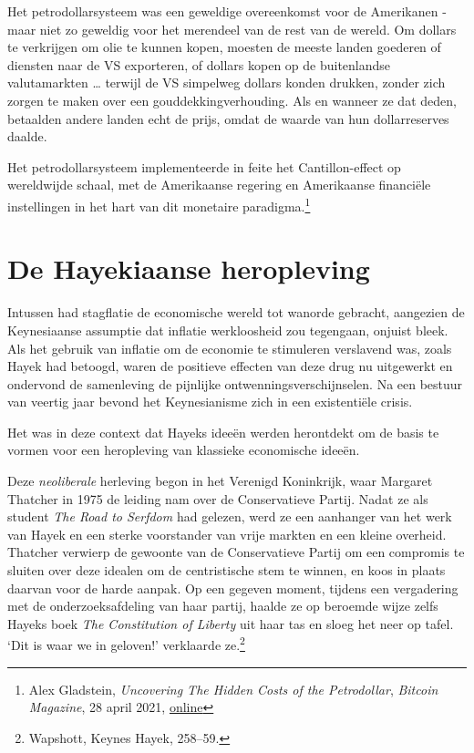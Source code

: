 \documentclass[
  a5paper,
  smalldemyvopaper,11pt,twoside,onecolumn,openright,extrafontsizes,
hidelinks]{memoir}
\begin{document}
Het petrodollarsysteem was een geweldige overeenkomst voor de Amerikanen
- maar niet zo geweldig voor het merendeel van de rest van de wereld. Om
dollars te verkrijgen om olie te kunnen kopen, moesten de meeste landen
goederen of diensten naar de VS exporteren, of dollars kopen op de
buitenlandse valutamarkten \ldots{} terwijl de VS simpelweg dollars
konden drukken, zonder zich zorgen te maken over een
gouddekkingverhouding. Als en wanneer ze dat deden, betaalden andere
landen echt de prijs, omdat de waarde van hun dollarreserves daalde.

Het petrodollarsysteem implementeerde in feite het Cantillon-effect op
wereldwijde schaal, met de Amerikaanse regering en Amerikaanse
financiële instellingen in het hart van dit monetaire
paradigma.\footnote{Alex Gladstein, \emph{Uncovering The Hidden Costs of
  the Petrodollar}, \emph{Bitcoin Magazine}, 28 april 2021,
  \href{https://bitcoinmagazine.com/culture/the-hidden-costs-of-the-petrodollar}{online}}

\section{De Hayekiaanse heropleving}\label{de-hayekiaanse-heropleving}

Intussen had stagflatie de economische wereld tot wanorde gebracht,
aangezien de Keynesiaanse assumptie dat inflatie werkloosheid zou
tegengaan, onjuist bleek. Als het gebruik van inflatie om de economie te
stimuleren verslavend was, zoals Hayek had betoogd, waren de positieve
effecten van deze drug nu uitgewerkt en ondervond de samenleving de
pijnlijke ontwenningsverschijnselen. Na een bestuur van veertig jaar
bevond het Keynesianisme zich in een existentiële crisis.

Het was in deze context dat Hayeks ideeën werden herontdekt om de basis
te vormen voor een heropleving van klassieke economische ideeën.

Deze \emph{neoliberale} herleving begon in het Verenigd Koninkrijk, waar
Margaret Thatcher in 1975 de leiding nam over de Conservatieve Partij.
Nadat ze als student \emph{The Road to Serfdom} had gelezen, werd ze een
aanhanger van het werk van Hayek en een sterke voorstander van vrije
markten en een kleine overheid. Thatcher verwierp de gewoonte van de
Conservatieve Partij om een compromis te sluiten over deze idealen om de
centristische stem te winnen, en koos in plaats daarvan voor de harde
aanpak. Op een gegeven moment, tijdens een vergadering met de
onderzoeksafdeling van haar partij, haalde ze op beroemde wijze zelfs
Hayeks boek \emph{The Constitution of Liberty} uit haar tas en sloeg het
neer op tafel. `Dit is waar we in geloven!' verklaarde ze.\footnote{Wapshott,
  Keynes Hayek, 258--59.}
\end{document}
